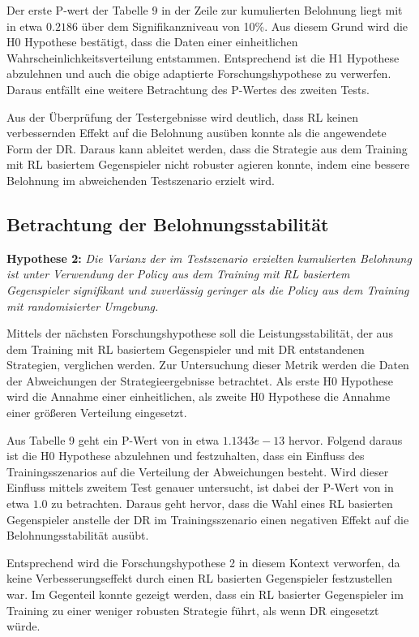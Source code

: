 Der erste P-wert der Tabelle 9 in der Zeile zur kumulierten Belohnung liegt mit in etwa $0.2186$ über dem Signifikanzniveau von 10\%.
Aus diesem Grund wird die H0 Hypothese bestätigt, dass die Daten einer einheitlichen Wahrscheinlichkeitsverteilung entstammen.
Entsprechend ist die H1 Hypothese abzulehnen und auch die obige adaptierte Forschungshypothese zu verwerfen.
Daraus entfällt eine weitere Betrachtung des P-Wertes des zweiten Tests.

Aus der Überprüfung der Testergebnisse wird deutlich, dass RL keinen verbessernden Effekt auf die Belohnung ausüben konnte als die angewendete Form der DR.
Daraus kann ableitet werden, dass die Strategie aus dem Training mit RL basiertem Gegenspieler nicht robuster agieren konnte, indem eine bessere Belohnung im abweichenden Testszenario erzielt wird.

\subsection{Betrachtung der Belohnungsstabilität}

\textbf{Hypothese 2:}
\textit{Die Varianz der im Testszenario erzielten kumulierten Belohnung ist unter Verwendung der Policy aus dem Training mit RL basiertem Gegenspieler signifikant und zuverlässig geringer als die Policy aus dem Training mit randomisierter Umgebung.}

Mittels der nächsten Forschungshypothese soll die Leistungsstabilität, der aus dem Training mit RL basiertem Gegenspieler und mit DR entstandenen Strategien, verglichen werden.
Zur Untersuchung dieser Metrik werden die Daten der Abweichungen der Strategieergebnisse betrachtet.
Als erste H0 Hypothese wird die Annahme einer einheitlichen, als zweite H0 Hypothese die Annahme einer größeren Verteilung eingesetzt.

Aus Tabelle 9 geht ein P-Wert von in etwa $1.1343e-13$ hervor.
Folgend daraus ist die H0 Hypothese abzulehnen und festzuhalten, dass ein Einfluss des Trainingsszenarios auf die Verteilung der Abweichungen besteht.
Wird dieser Einfluss mittels zweitem Test genauer untersucht, ist dabei der P-Wert von in etwa $1.0$ zu betrachten.
Daraus geht hervor, dass die Wahl eines RL basierten Gegenspieler anstelle der DR im Trainingsszenario einen negativen Effekt auf die Belohnungsstabilität ausübt.

Entsprechend wird die Forschungshypothese 2 in diesem Kontext verworfen, da keine Verbesserungseffekt durch einen RL basierten Gegenspieler festzustellen war.
Im Gegenteil konnte gezeigt werden, dass ein RL basierter Gegenspieler im Training zu einer weniger robusten Strategie führt, als wenn DR eingesetzt würde.

